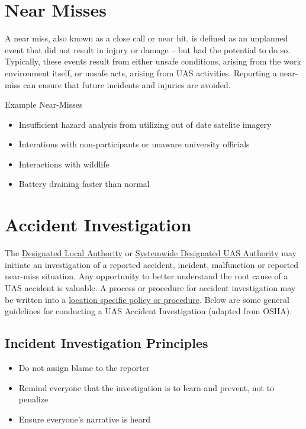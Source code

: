 \documentclass[
]{book}
\providecommand{\tightlist}{%
  \setlength{\itemsep}{0pt}\setlength{\parskip}{0pt}}
\begin{document}
\hypertarget{s-near-misses}{%
\section{Near Misses}\label{s-near-misses}}

A near miss, also known as a close call or near hit, is defined as an unplanned event that did not result in injury or damage -- but had the potential to do so. Typically, these events result from either unsafe conditions, arising from the work environment itself, or unsafe acts, arising from UAS activities. Reporting a near-miss can ensure that future incidents and injuries are avoided.

Example Near-Misses

\begin{itemize}
\tightlist
\item
  Insufficient hazard analysis from utilizing out of date satelite imagery
\item
  Interations with non-participants or unaware university officials
\item
  Interactions with wildlife
\item
  Battery draining faster than normal
\end{itemize}

\hypertarget{s-investigation}{%
\section{Accident Investigation}\label{s-investigation}}

The \protect\hyperlink{DLA}{Designated Local Authority} or \protect\hyperlink{SDA}{Systemwide Designated UAS Authority} may initiate an investigation of a reported accident, incident, malfunction or reported near-miss situation. Any opportunity to better understand the root cause of a UAS accident is valuable. A process or procedure for accident investigation may be written into a \protect\hyperlink{LSP}{location specific policy or procedure}. Below are some general guidelines for conducting a UAS Accident Investigation (adapted from OSHA).

\hypertarget{incident-investigation-principles}{%
\subsection{Incident Investigation Principles}\label{incident-investigation-principles}}

\begin{itemize}
\tightlist
\item
  Do not assign blame to the reporter
\item
  Remind everyone that the investigation is to learn and prevent, not to penalize
\item
  Ensure everyone's narrative is heard
\end{itemize}
\end{document}
